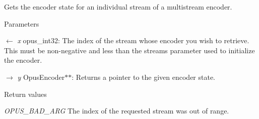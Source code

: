 Gets the encoder state for an individual stream of a multistream encoder. 
\begin{DoxyParams}{Parameters}
\item[\mbox{$\leftarrow$} {\em x}]{\ttfamily opus\_\-int32}: The index of the stream whose encoder you wish to retrieve. This must be non-\/negative and less than the {\ttfamily streams} parameter used to initialize the encoder. \item[\mbox{$\rightarrow$} {\em y}]{\ttfamily OpusEncoder$\ast$$\ast$}: Returns a pointer to the given encoder state. \end{DoxyParams}

\begin{DoxyRetVals}{Return values}
\item[{\em OPUS\_\-BAD\_\-ARG}]The index of the requested stream was out of range. \end{DoxyRetVals}
